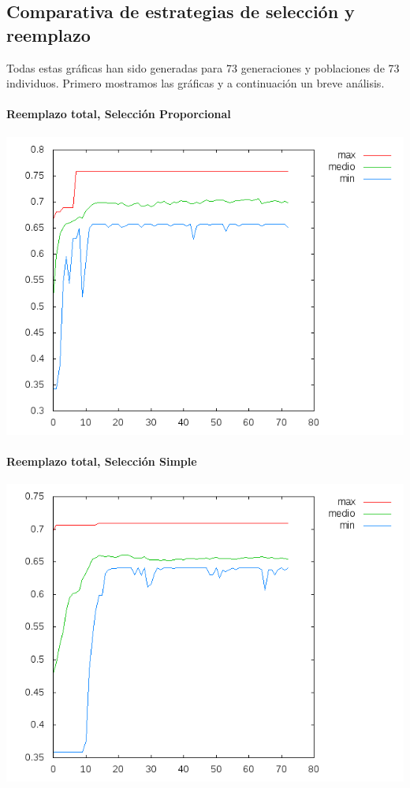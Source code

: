 \documentclass[nochap]{apuntes}
\begin{document}
\subsection{Comparativa de estrategias de selección y reemplazo}

Todas estas gráficas han sido generadas para 73 generaciones y poblaciones de 73 individuos. Primero mostramos las gráficas y a continuación un breve análisis.



\paragraph{Reemplazo total, Selección Proporcional}
\begin{center}
\includegraphics[scale=0.6]{tex/img/g73_p73_ReemplazoTotal_SeleccionProporcionalAlFitness_reg11.png}
\end{center}

\paragraph{Reemplazo total, Selección Simple}
\begin{center}
\includegraphics[scale=0.6]{tex/img/g73_p73_ReemplazoTotal_SeleccionSimple_reg11.png}
\end{center}
\end{document}
